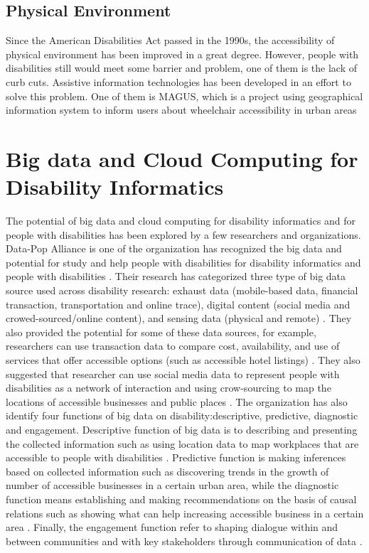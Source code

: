 \documentclass[sigconf]{acmart}
\begin{document}
\subsection{Physical Environment}
Since the American Disabilities Act passed in the 1990s, the accessibility of physical environment has been
improved in a great degree. However, people with disabilities still would meet some barrier and problem, 
one of them is the lack of curb cuts. Assistive information technologies has been developed in an effort to
solve this problem. One of them is MAGUS, which is a project using geographical information system to inform 
users about wheelchair accessibility in urban areas \cite{Appleyard2005}



\section{Big data and Cloud Computing for Disability Informatics}
The potential of big data and cloud computing for disability informatics and for people with disabilities has 
been explored by a few researchers and organizations. Data-Pop Alliance is one of the organization has recognized 
the big data and potential for study and help people with disabilities for disability informatics and people 
with disabilities \cite{Datapop}. Their research has categorized three type of big data source used across disability
research: exhaust data (mobile-based data, financial transaction, transportation and online trace), digital 
content (social media and crowed-sourced/online content), and sensing data (physical and remote) \cite{Datapop}. 
They also provided the potential for some of these data sources, for example, researchers can use transaction 
data to compare cost, availability, and use of services that offer accessible options (such as accessible hotel 
listings) \cite{Datapop}. They also suggested that researcher can use social media data to represent people with
disabilities as a network of interaction and using crow-sourcing to map the locations of accessible businesses 
and public places \cite{Datapop}. 
The organization has also identify four functions of big data on disability:descriptive, predictive, diagnostic 
and engagement. Descriptive function of big data is to describing and presenting the collected information such
as using location data to map workplaces that are accessible to people with disabilities \cite{Datapop}. 
Predictive function is making inferences based on collected information such as discovering trends in the 
growth of number of accessible businesses in a certain urban area, while the diagnostic function means
establishing and making recommendations on the basis of causal relations such as showing what can help 
increasing accessible business in a certain area \cite{Datapop}. Finally, the engagement function refer
to shaping dialogue within and between communities and with key stakeholders through communication of data \cite{Datapop}.
\end{document}
